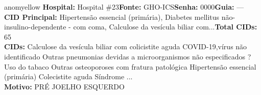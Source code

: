 \documentclass[a4paper,10pt]{article}
\begin{document}
\begin{anomalycard}[Interna\c{c}\~{a}o \#464 | Pac. \#536 | MODERADO (z=2.19) | LOS: 2d | 10/03/2026\,$\to$\,12/03/2026]{anomyellow}
\textbf{Hospital:} Hospital \#23\quad \textbf{Fonte:} GHO-ICS\quad \textbf{Senha:} 0000\quad \textbf{Guia:} ---\\

\textbf{CID Principal:} {\small Hipertensão essencial (primária), Diabetes mellitus não-insulino-dependente - com coma, Calculose da vesícula biliar com...}\quad\textbf{Total CIDs:} 65\\

\textbf{CIDs:} {\scriptsize Calculose da vesícula biliar com colicistite aguda \textbar{} COVID-19,vírus não identificado \textbar{} Outras pneumonias devidas a microorganismos não especificados \textbar{} ? \textbar{} Uso do tabaco \textbar{} Outras osteoporoses com fratura patológica \textbar{} Hipertensão essencial (primária) \textbar{} Colecistite aguda \textbar{} Síndrome ...}\\

\textbf{Motivo:} {\scriptsize PRÉ JOELHO ESQUERDO}\\

\end{anomalycard}
\end{document}
